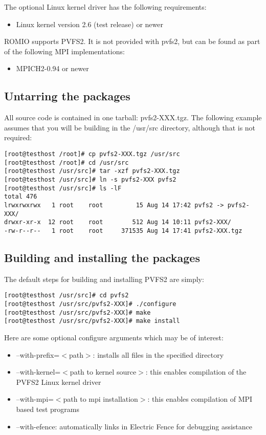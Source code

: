 \documentclass[11pt, letterpaper]{article}
\begin{document}
The optional Linux kernel driver has the following requirements:
\begin{itemize}
\item Linux kernel version 2.6 (test release) or newer
\end{itemize}

ROMIO supports PVFS2.  It is not provided with pvfs2, but can be found as part
of the following MPI implementations:

\begin{itemize}
\item MPICH2-0.94 or newer
\end{itemize}

\subsection{Untarring the packages}

All source code is contained in one tarball: pvfs2-XXX.tgz.  The following example assumes that you will be building in the /usr/src directory, although that is not required:

\begin{verbatim}
[root@testhost /root]# cp pvfs2-XXX.tgz /usr/src
[root@testhost /root]# cd /usr/src
[root@testhost /usr/src]# tar -xzf pvfs2-XXX.tgz
[root@testhost /usr/src]# ln -s pvfs2-XXX pvfs2
[root@testhost /usr/src]# ls -lF
total 476
lrwxrwxrwx   1 root    root         15 Aug 14 17:42 pvfs2 -> pvfs2-XXX/
drwxr-xr-x  12 root    root        512 Aug 14 10:11 pvfs2-XXX/
-rw-r--r--   1 root    root     371535 Aug 14 17:41 pvfs2-XXX.tgz

\end{verbatim}

\subsection{Building and installing the packages}

The default steps for building and installing PVFS2 are simply:

\begin{verbatim}
[root@testhost /usr/src]# cd pvfs2
[root@testhost /usr/src/pvfs2-XXX]# ./configure
[root@testhost /usr/src/pvfs2-XXX]# make
[root@testhost /usr/src/pvfs2-XXX]# make install
\end{verbatim}

Here are some optional configure arguments which may be of interest:
\begin{itemize}
\item --with-prefix=$<$path$>$: installs all files in the specified directory
\item --with-kernel=$<$path to kernel source$>$: this enables compilation of
the PVFS2 Linux kernel driver
\item --with-mpi=$<$path to mpi installation$>$: this enables compilation of MPI
based test programs
\item --with-efence: automatically links in Electric Fence for debugging assistance
\end{itemize}
\end{document}

